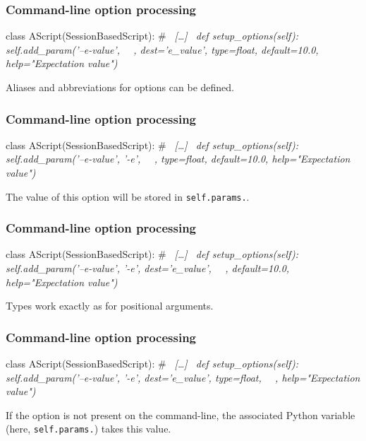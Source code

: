 \documentclass[english,serif,mathserif,xcolor=pdftex,dvipsnames,table]{beamer}
\begin{document}
\begin{frame}[fragile]
  \frametitle{Command-line option processing}

  \begin{python}
class AScript(SessionBasedScript):
  # ~\em [\ldots]~
  def setup_options(self):
    self.add_param('--e-value', ~~, dest='e_value',
                   type=float, default=10.0,
                   help="Expectation value")
  \end{python}

  \+
  Aliases and abbreviations for options can be defined.
\end{frame}


\begin{frame}[fragile]
  \frametitle{Command-line option processing}

  \begin{python}
class AScript(SessionBasedScript):
  # ~\em [\ldots]~
  def setup_options(self):
    self.add_param('--e-value', '-e', ~~,
                   type=float, default=10.0,
                   help="Expectation value")
  \end{python}

  \+
  The value of this option will be stored in \lstinline|self.params.|\texttt{}.

\end{frame}


\begin{frame}[fragile]
  \frametitle{Command-line option processing}

  \begin{python}
class AScript(SessionBasedScript):
  # ~\em [\ldots]~
  def setup_options(self):
    self.add_param('--e-value', '-e', dest='e_value',
                   ~~, default=10.0,
                   help="Expectation value")
  \end{python}

  \+
  Types work exactly as for positional arguments.
\end{frame}


\begin{frame}[fragile]
  \frametitle{Command-line option processing}

  \begin{python}
class AScript(SessionBasedScript):
  # ~\em [\ldots]~
  def setup_options(self):
    self.add_param('--e-value', '-e', dest='e_value',
                   type=float, ~~,
                   help="Expectation value")
  \end{python}

  \+
  If the option is not present on the command-line, the associated
  Python variable (here,
  \lstinline|self.params.|\texttt{}) takes this value.
\end{frame}
\end{document}
